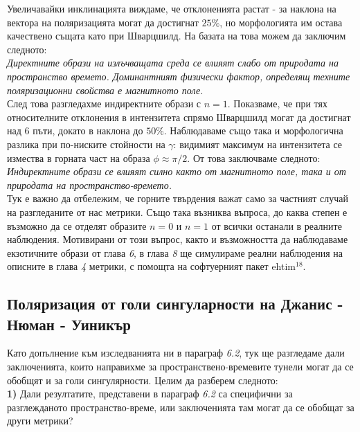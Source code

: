 Увеличавайки инклинацията виждаме, че отклоненията растат - за наклона на вектора на поляризацията могат да достигнат $25\%$, но морфологията им остава качествено същата като при Шварцшилд. На базата на това можем да заключим следното:\\

\emph{Директните образи на излъчващата среда се влияят слабо от природата на пространство времето. Доминантният физически фактор, определящ техните поляризационни свойства е магнитното поле.}\\

След това разгледахме индиректните образи с $n = 1$. Показваме, че при тях относителните отклонения в интензитета спрямо Шварцшилд могат да достигнат над 6 пъти, докато в наклона до $50\%$. Наблюдаваме също така и морфологична разлика при по-ниските стойности на $\gamma$: видимият максимум на интензитета се измества в горната част на образа $\phi\approx\pi / 2$. От това заключваме следното:\\

\emph{Индиректните образи се влияят силно както от магнитното поле, така и от природата на пространство-времето.}\\

Тук е важно да отбележим, че горните твърдения важат само за частният случай на разгледаните от нас метрики. Също така възниква въпроса, до каква степен е възможно да се отделят образите $n = 0$ и $n = 1$ от всички останали в реалните наблюдения. Мотивирани от този въпрос, както и възможността да наблюдаваме екзотичните образи от глава \emph{6}, в глава \emph{8} ще симулираме реални наблюдения на описните в глава \emph{4} метрики, с помощта на софтуерният пакет ehtim$^{18}$.

\subsection{Поляризация от голи сингуларности на Джанис - Нюман - Уиникър}

Като допълнение към изследванията ни в параграф \emph{6.2}, тук ще разгледаме дали заключенията, които направихме за пространствено-времевите тунели могат да се обобщят и за голи сингулярности. Целим да разберем следното:\\

\textbf{1)} Дали резултатите, представени в параграф \emph{6.2} са специфични за разглежданото пространство-време, или заключенията там могат да се обобщат за други метрики?\\

